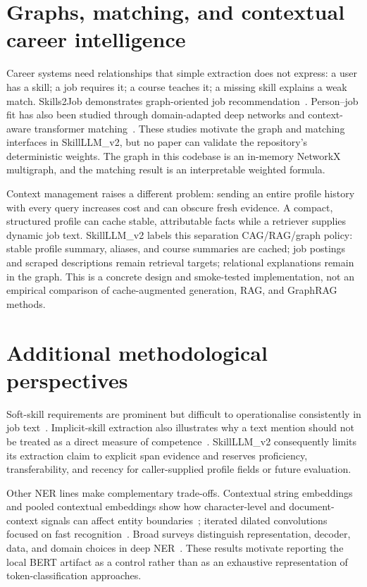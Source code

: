 \section{Graphs, matching, and contextual career intelligence}

Career systems need relationships that simple extraction does not express: a user has a skill; a job requires it; a course teaches it; a missing skill explains a weak match. Skills2Job demonstrates graph-oriented job recommendation~\cite{giabelli2021skills2job}. Person--job fit has also been studied through domain-adapted deep networks and context-aware transformer matching~\cite{bian2019domain,li2020competence}. These studies motivate the graph and matching interfaces in SkillLLM\_v2, but no paper can validate the repository's deterministic weights. The graph in this codebase is an in-memory NetworkX multigraph, and the matching result is an interpretable weighted formula.

Context management raises a different problem: sending an entire profile history with every query increases cost and can obscure fresh evidence. A compact, structured profile can cache stable, attributable facts while a retriever supplies dynamic job text. SkillLLM\_v2 labels this separation CAG/RAG/graph policy: stable profile summary, aliases, and course summaries are cached; job postings and scraped descriptions remain retrieval targets; relational explanations remain in the graph. This is a concrete design and smoke-tested implementation, not an empirical comparison of cache-augmented generation, RAG, and GraphRAG methods.

\section{Additional methodological perspectives}

Soft-skill requirements are prominent but difficult to operationalise consistently in job text~\cite{sayfullina2018softskill,calanca2019responsible}. Implicit-skill extraction also illustrates why a text mention should not be treated as a direct measure of competence~\cite{gugnani2020implicit}. SkillLLM\_v2 consequently limits its extraction claim to explicit span evidence and reserves proficiency, transferability, and recency for caller-supplied profile fields or future evaluation.

Other NER lines make complementary trade-offs. Contextual string embeddings and pooled contextual embeddings show how character-level and document-context signals can affect entity boundaries~\cite{akbik2018flair,akbik2019pooled}; iterated dilated convolutions focused on fast recognition~\cite{strubell2017idcnn}. Broad surveys distinguish representation, decoder, data, and domain choices in deep NER~\cite{li2022nersurvey}. These results motivate reporting the local BERT artifact as a control rather than as an exhaustive representation of token-classification approaches.


